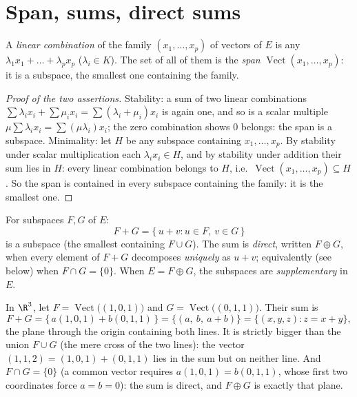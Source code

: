 \section{Span, sums, direct sums}

\begin{definition}\label{def:b1:vspaces:span}
A \emph{linear combination} of the family $(x_1, \dots, x_p)$ of
vectors of $E$ is any $\lambda_1 x_1 + \dots + \lambda_p x_p$
($\lambda_i \in K$). The set of all of them is the
\emph{span} $\operatorname{Vect}(x_1, \dots, x_p)$: it
is a subspace, the smallest one containing the family.
\end{definition}

\begin{proof}[Proof of the two assertions]
Stability: a sum of two linear combinations $\sum\lambda_i x_i +
\sum\mu_i x_i = \sum(\lambda_i + \mu_i)x_i$ is again one, and so
is a scalar multiple $\mu\sum\lambda_i x_i = \sum(\mu\lambda_i)
x_i$; the zero combination shows $0$ belongs: the span is a
subspace. Minimality: let $H$ be any subspace containing $x_1,
\dots, x_p$. By stability under scalar multiplication each
$\lambda_i x_i \in H$, and by stability under addition their sum
lies in $H$: every linear combination belongs to $H$, i.e.\
$\operatorname{Vect}(x_1, \dots, x_p) \subseteq H$. So the span
is contained in every subspace containing the family: it is the
smallest one.
\end{proof}

\begin{definition}[Sum, direct sum]\label{def:b1:vspaces:sum}
For subspaces $F, G$ of $E$:
\[
F + G = \{\,u + v : u \in F,\ v \in G\,\}
\]
is a subspace (the smallest containing $F \cup G$). The sum is
\emph{direct}, written $F \oplus G$, when every
element of $F + G$ decomposes \emph{uniquely} as $u + v$;
equivalently (see below) when $F \cap G = \{0\}$. When $E = F \oplus
G$, the subspaces are \emph{supplementary} in $E$.
\end{definition}

\begin{example}
\label{ex:b1:vspaces:sumoflines}
In $\R^3$, let $F = \operatorname{Vect}\bigl((1,0,1)\bigr)$ and
$G = \operatorname{Vect}\bigl((0,1,1)\bigr)$. Their sum is
\[
F + G = \{\,a(1,0,1) + b(0,1,1)\,\}
= \{(a,\ b,\ a + b)\} = \{(x, y, z) : z = x + y\},
\]
the plane through the origin containing both lines. It is
strictly bigger than the union $F \cup G$ (the mere cross of the
two lines): the vector $(1, 1, 2) = (1,0,1) + (0,1,1)$ lies in
the sum but on neither line. And $F \cap G = \{0\}$ (a common
vector requires $a(1,0,1) = b(0,1,1)$, whose first two
coordinates force $a = b = 0$): the sum is direct, and $F \oplus
G$ is exactly that plane.
\end{example}

